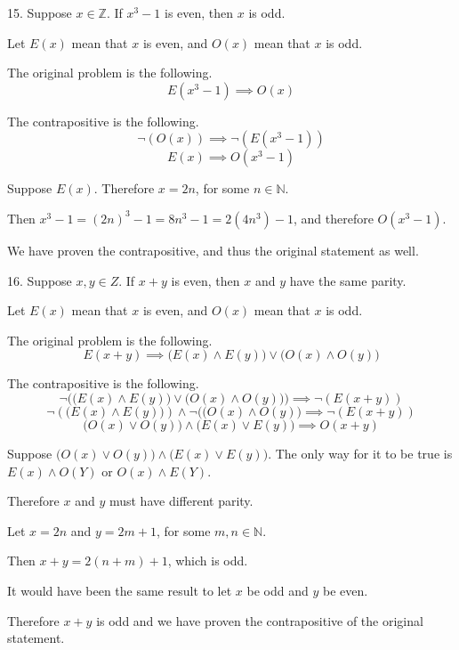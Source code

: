 \documentclass[openany, 12pt]{book}
\begin{document}
\begin{exercise}{}{} { 15. Suppose $x \in \mathbb{Z}$. If $x^3 - 1$ is even, then $x$ is odd.}
	\begin{alist}
		\item Let $E(x)$ mean that $x$ is even, and $O(x)$ mean that $x$ is odd.
		\item The original problem is the following.
		$$
			E(x^3-1) \implies O(x)
		$$
		\item The contrapositive is the following.
		$$
			\neg(O(x))
			\implies
			\neg(E(x^3-1))
		$$
		$$
			E(x)
			\implies
			O(x^3-1)
		$$
		\item Suppose $E(x)$. Therefore $x=2n$, for some $n \in \mathbb{N}$.
		\item Then $x^3-1=(2n)^3 -1 = 8n^3 -1 = 2 (4n^3) -1$, and therefore
		$O(x^3-1)$.
		\item We have proven the contrapositive, and thus the original statement as
		well.
	\end{alist}
\end{exercise}

\begin{exercise}{}{} { 16. Suppose $x, y \in Z$. If $x+y$ is even, then $x$ and $y$ have the same parity.}
	\begin{alist}
		\item Let $E(x)$ mean that $x$ is even, and $O(x)$ mean that $x$ is odd.
		\item The original problem is the following.
		$$
			E(x+y)
			\implies
			\big(E(x) \land E(y)\big) \lor \big(O(x) \land O(y)\big)
		$$
		\item The contrapositive is the following.
		$$
			\neg\Big(\big(E(x) \land E(y)\big) \lor \big(O(x) \land O(y)\big)\Big)
			\implies
			\neg(E(x+y))
		$$
		$$
			\neg(\big(E(x) \land E(y)\big)) \land \neg(\big(O(x) \land O(y)\big)
			\implies
			\neg(E(x+y))
		$$
		$$
			\big(O(x) \lor O(y)\big) \land \big(E(x) \lor E(y)\big)
			\implies
			O(x+y)
		$$
		\item Suppose
		$\big(O(x) \lor O(y)\big) \land \big(E(x) \lor E(y)\big)$. The only way
		for it to be true is $E(x) \land O(Y)$ or $O(x) \land E(Y)$.
		\item Therefore $x$ and $y$ must have different parity.
		\item Let $x=2n$ and $y=2m+1$, for some $m, n \in \mathbb{N}$.
		\item Then $x+y = 2(n+m) +1$, which is odd.
		\item It would have been the same result to let $x$ be odd and $y$ be even.
		\item Therefore $x+y$ is odd and we have proven the contrapositive of the
		original statement.
	\end{alist}
\end{exercise}
\end{document}
